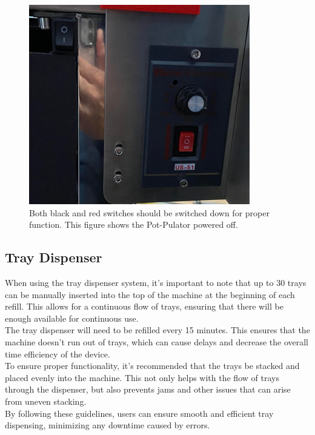 \documentclass[12pt, titlepage]{article}
\begin{document}
\begin{figure}[H]
    \centering
    \includegraphics{switches.png}
    \caption{Both black and red switches should be switched down for proper function. This figure shows the Pot-Pulator powered off.}
    \label{fig:scope}
  \end{figure}
\newpage
\subsection{Tray Dispenser}
When using the tray dispenser system, it's important to note that up to 30 trays can be manually inserted into the top of the machine at the beginning of each refill. This allows for a continuous flow of trays, ensuring that there will be enough available for continuous use.
\\
\noindent The tray dispenser will need to be refilled every 15 minutes. This ensures that the machine doesn't run out of trays, which can cause delays and decrease the overall time efficiency of the device.
\\
\noindent To ensure proper functionality, it's recommended that the trays be stacked and placed evenly into the machine. This not only helps with the flow of trays through the dispenser, but also prevents jams and other issues that can arise from uneven stacking.
\\
\noindent By following these guidelines, users can ensure smooth and efficient tray dispensing, minimizing any downtime caused by errors.
\end{document}
